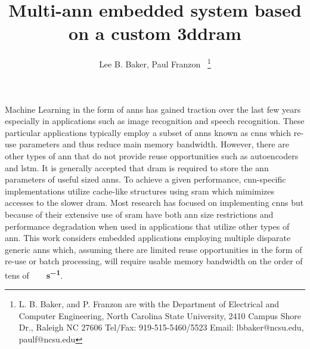 \documentclass[journal]{IEEEtran}
\begin{document}
\title{Multi-\acs{ann} embedded system based on a custom \acs{3ddram}}
%
%
\author{{Lee B. Baker, Paul Franzon~}
\thanks{L. B. Baker, and P. Franzon are with the Department of Electrical and Computer Engineering,
North Carolina State University,
2410 Campus Shore Dr., Raleigh NC 27606 
Tel/Fax:
919-515-5460/5523
Email: 
lbbaker@ncsu.edu,
paulf@ncsu.edu}}

\date{}
\vspace{-10mm}

\maketitle

\vspace{-10mm}
Machine Learning in the form of \acfp{ann} has gained traction over the last few years especially in applications such as image recognition and speech recognition.
These particular applications typically employ a subset of \acp{ann} known as \acp{cnn} which re-use parameters and thus reduce main memory bandwidth.
However, there are other types of \ac{ann} that do not provide reuse opportunities such as autoencoders \iffalse\cite{le2013building} \fi and \ac{lstm}\iffalse\cite{}\fi . \iffalse and implementations that focus on \ac{cnn}s suffer from severe performance degradation when targeting these other types of \acp{ann}. \fi
It is generally accepted that \ac{dram} is required to store the \ac{ann} parameters of useful sized \acp{ann}\iffalse \cite{azarkhish2017neurostream}\cite{dadiannao2014}\cite{dadiannao2017}\fi.
To achieve a given performance, \ac{cnn}-specific implementations utilize cache-like structures using \ac{sram} which mimimizes accesses to the slower \ac{dram}.
Most research has focused on implementing \acp{cnn} but because of their extensive use of \ac{sram} have both \ac{ann} size restrictions and performance degradation when used in applications that utilize other types of \ac{ann}.
This work considers embedded applications employing multiple disparate generic \acp{ann} which, assuming there are limited reuse opportunities in the form of re-use or batch processing, will require usable memory bandwidth on the order of tens of \textbf{\SI[per-mode=symbol]{}{\tera \bit \per \second}}. 
\end{document}
